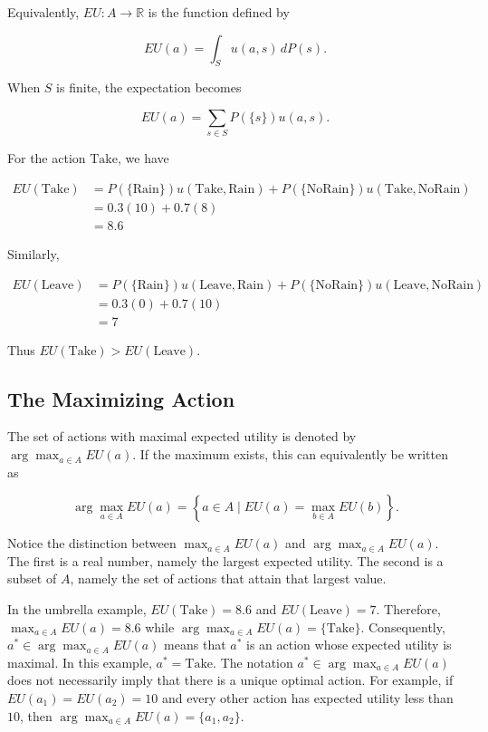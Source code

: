 \documentclass[10pt,a4paper]{book}
\begin{document}
Equivalently,
$
    EU:A\longrightarrow\mathbb{R}
$
is the function defined by

$$
    EU(a)=\int_Su(a,s)\,dP(s).
$$

When \(S\) is finite, the expectation becomes

$$
    EU(a)
    =
    \sum_{s\in S}P(\{s\})u(a,s).
$$

For the action \(\mathrm{Take}\), we have

$$
    \begin{aligned}
        EU(\mathrm{Take})
         & =
        P(\{\mathrm{Rain}\})u(\mathrm{Take},\mathrm{Rain})
        +
        P(\{\mathrm{NoRain}\})u(\mathrm{Take},\mathrm{NoRain}) \\
         & =0.3(10)+0.7(8)                                     \\
         & =8.6
    \end{aligned}
$$

Similarly,

$$
    \begin{aligned}
        EU(\mathrm{Leave})
         & =
        P(\{\mathrm{Rain}\})u(\mathrm{Leave},\mathrm{Rain})
        +
        P(\{\mathrm{NoRain}\})u(\mathrm{Leave},\mathrm{NoRain}) \\
         & =0.3(0)+0.7(10)                                      \\
         & =7
    \end{aligned}
$$

Thus
$
    EU(\mathrm{Take})>EU(\mathrm{Leave}).
$

\subsection{The Maximizing Action}

The set of actions with maximal expected utility is denoted by
$
    \arg\max_{a\in A}EU(a).
$
If the maximum exists, this can equivalently be written as

$$
    \arg\max_{a\in A}EU(a)
    =
    \left\{
    a\in A \mid
    EU(a)=\max_{b\in A}EU(b)
    \right\}.
$$

Notice the distinction between
$
    \max_{a\in A}EU(a)
$
and
$
    \arg\max_{a\in A}EU(a).
$
The first is a real number, namely the largest expected utility. The second is a subset of \(A\), namely the set of actions that attain that largest value.

In the umbrella example,
$
    EU(\mathrm{Take})=8.6
$
and
$
    EU(\mathrm{Leave})=7.
$
Therefore,
$
    \max_{a\in A}EU(a)=8.6
$
while
$
    \arg\max_{a\in A}EU(a)
    =
    \{\mathrm{Take}\}.
$
Consequently,
$
    a^*\in\arg\max_{a\in A}EU(a)
$
means that \(a^*\) is an action whose expected utility is maximal.
In this example,
$
    a^*=\mathrm{Take}.
$
The notation \(a^*\in\arg\max_{a\in A}EU(a)\) does not necessarily imply that there is a unique optimal action. For example, if
$
    EU(a_1)=EU(a_2)=10
$
and every other action has expected utility less than \(10\), then
$
    \arg\max_{a\in A}EU(a)=\{a_1,a_2\}.
$
\end{document}
